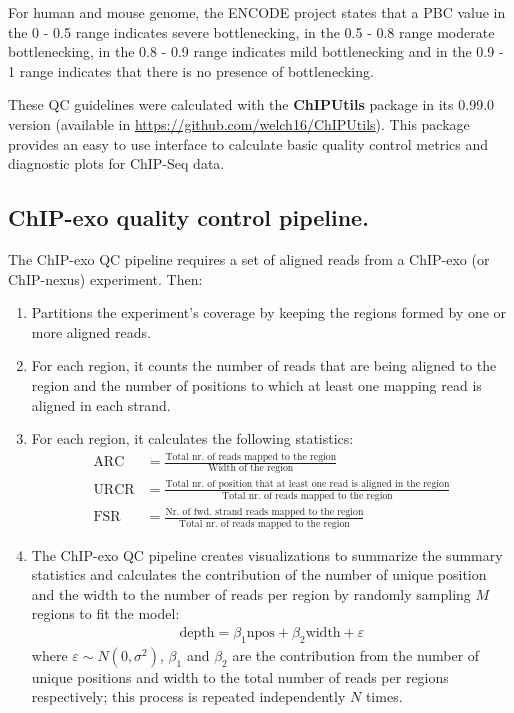 \documentclass{bmcart}\usepackage[]{graphicx}\usepackage[]{color}
\begin{document}
For human and mouse genome, the ENCODE project states that a PBC value
in the 0 - 0.5 range indicates severe bottlenecking, in the 0.5 - 0.8
range moderate bottlenecking, in the 0.8 - 0.9 range indicates mild
bottlenecking and in the 0.9 - 1 range indicates that there is no
presence of bottlenecking.

These QC guidelines were calculated with the \textbf{ChIPUtils}
package in its 0.99.0 version (available in
\url{https://github.com/welch16/ChIPUtils}). This package provides an
easy to use interface to calculate basic quality control metrics and
diagnostic plots for ChIP-Seq data.

\subsection*{ChIP-exo quality control pipeline.}

The ChIP-exo QC pipeline requires a set of aligned reads from a
ChIP-exo (or ChIP-nexus) experiment. Then:

\begin{enumerate}
\item Partitions the experiment's coverage by keeping the regions
  formed by one or more aligned reads.
\item For each region, it counts the number of reads that are being
  aligned to the region and the number of positions to which at least
  one mapping read is aligned in each strand.
\item For each region, it calculates the following statistics:
  \begin{align*}
    \mbox{ARC} &= \frac{\text{Total nr. of reads mapped to the region}}{\text{Width of the region}} \\
    \mbox{URCR} &= \frac{\text{Total nr. of position that at least
        one read is aligned in the region}}{\text{Total nr. of reads mapped 
              to the region}} \\
    \mbox{FSR} &= \frac{\text{Nr. of fwd. strand reads mapped to the region}}                 {\text{Total nr. of reads mapped to the region}} 
  \end{align*}
\item The ChIP-exo QC pipeline creates visualizations to summarize the
  summary statistics and calculates the contribution of the number of
  unique position and the width to the number of reads per region by
  randomly sampling $M$ regions to fit the model:
  \begin{align*}
    \mbox{depth} = \beta_1 \mbox{npos} + \beta_2 \mbox{width} + \varepsilon
  \end{align*}
  where $\varepsilon \sim N(0,\sigma^2)$, $\beta_1$ and $\beta_2$ are
  the contribution from the number of unique positions and width to
  the total number of reads per regions respectively; this process is
  repeated independently $N$ times. 
\end{enumerate}
\end{document}
